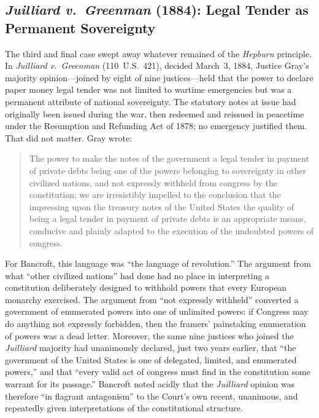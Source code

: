 \documentclass[12pt]{article}
\begin{document}
\subsection{\textit{Juilliard v.\ Greenman} (1884): Legal Tender as
             Permanent Sovereignty}

The third and final case swept away whatever remained of the
\textit{Hepburn} principle.  In \textit{Juilliard v.\ Greenman}
(110~U.S.\ 421), decided March~3, 1884, Justice Gray's majority
opinion---joined by eight of nine justices---held that the power to
declare paper money legal tender was not limited to wartime emergencies
but was a permanent attribute of national sovereignty.  The statutory
notes at issue had originally been issued during the war, then redeemed
and reissued in peacetime under the Resumption and Refunding Act of
1878; no emergency justified them.  That did not matter.  Gray wrote:

\begin{quote}
The power to make the notes of the government a legal tender in payment
of private debts being one of the powers belonging to sovereignty in
other civilized nations, and not expressly withheld from congress by
the constitution; we are irresistibly impelled to the conclusion that
the impressing upon the treasury notes of the United States the quality
of being a legal tender in payment of private debts is an appropriate
means, conducive and plainly adapted to the execution of the undoubted
powers of congress.
\end{quote}

For Bancroft, this language was ``the language of revolution.''
The argument from what ``other civilized nations'' had done had no place
in interpreting a constitution deliberately designed to withhold powers
that every European monarchy exercised.  The argument from ``not
expressly withheld'' converted a government of enumerated powers into
one of unlimited powers: if Congress may do anything not expressly
forbidden, then the framers' painstaking enumeration of powers was a
dead letter.  Moreover, the same nine justices who joined the
\textit{Juilliard} majority had unanimously declared, just two years
earlier, that ``the government of the United States is one of delegated,
limited, and enumerated powers,'' and that ``every valid act of congress
must find in the constitution some warrant for its passage.''  Bancroft
noted acidly that the \textit{Juilliard} opinion was therefore ``in
flagrant antagonism'' to the Court's own recent, unanimous, and
repeatedly given interpretations of the constitutional structure.
\end{document}
